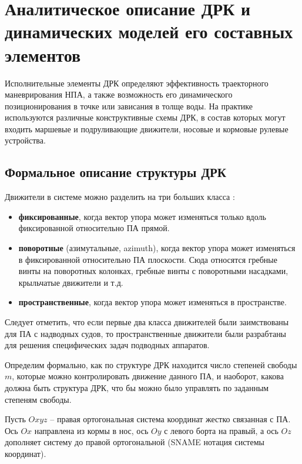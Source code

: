 \chapter{Аналитическое описание ДРК и динамических моделей его составных элементов}\label{ch:Propulsion}

Исполнительные элементы ДРК определяют эффективность траекторного маневрирования НПА, а также возможность его динамического позиционирования в точке или зависания в толще воды.
На практике используются различные конструктивные схемы ДРК, в состав которых могут входить маршевые и подруливающие движители, носовые и кормовые рулевые устройства.

\section{Формальное описание структуры ДРК}\label{sec:Propulsion/System}
Движители в системе можно разделить на три больших класса \cite{армишев86}:
\begin{itemize}
    \item \textbf{фиксированные}, когда вектор упора может изменяться только вдоль фиксированной относительно ПА прямой.
    \item \textbf{поворотные} (азимутальные, azimuth), когда вектор упора может изменяться в фиксированной относительно ПА плоскости.
    Сюда относятся гребные винты на поворотных колонках, гребные винты с поворотными насадками, крыльчатые движители и т.д.
    \item \textbf{пространственные}, когда вектор упора может изменяться в пространстве.
\end{itemize}
Следует отметить, что если первые два класса движителей были заимствованы для ПА с надводных судов, то пространственные движители были разрабтаны для решения специфических задач подводных аппаратов.

Определим формально, как по структуре ДРК находится число степеней свободы $m$, которые можно контролировать движение данного ПА, и наоборот, какова должна быть структура ДРК, что бы можно было управлять по заданным степеням свободы.

Пусть $Oxyz$ -- правая ортогональная система координат жестко связанная с ПА. Ось $Ox$ направлена из кормы в нос, ось $Oy$ с левого борта на правый, а ось $Oz$ дополняет систему до правой ортогональной (SNAME нотация системы координат).

